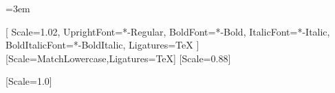 \RequirePackage{fontspec}
\usepackage{babel}
\usepackage{microtype}
\frenchspacing
\emergencystretch=3em
\hfuzz=2pt

\setmainfont{Inter}[
  Scale=1.02,
  UprightFont=*-Regular,
  BoldFont=*-Bold,
  ItalicFont=*-Italic,
  BoldItalicFont=*-BoldItalic,
  Ligatures=TeX
]
\setsansfont{Inter}[Scale=MatchLowercase,Ligatures=TeX]
\setmonofont{DejaVu Sans Mono}[Scale=0.88]
\usepackage{mathtools}
\usepackage{unicode-math}
[Scale=1.0]

\usepackage[a4paper,top=25mm,bottom=28mm,left=25mm,right=25mm,headheight=16pt]{geometry}
\usepackage{booktabs}
\usepackage{longtable}
\usepackage{array}
\usepackage{tabularx}
\usepackage{multirow}
\usepackage{float}
\usepackage{graphicx}
\usepackage{xcolor}
\usepackage{caption}
\usepackage{subcaption}
\usepackage{enumitem}
\usepackage{parskip}
\usepackage{setspace}
\usepackage{fancyhdr}
\usepackage{resizegather}
\usepackage{cancel}
\usepackage{siunitx}
\usepackage{listings}
\usepackage[most]{tcolorbox}
\usepackage{tikz}
\usetikzlibrary{arrows.meta,positioning,shapes.geometric,calc,decorations.pathmorphing}
\usepackage{hyperref}
\usepackage{cleveref}


\newcommand{\xipar}{\texorpdfstring{\ensuremath{\xi}}{xi}}
\newcommand{\pipar}{\texorpdfstring{\ensuremath{\pi}}{pi}}
\providecommand{\Tfield}{T(x,t)}
\providecommand{\Tfieldt}{T(\vec{x},t)}
\newcommand{\Efield}{E(x,t)}
\newcommand{\mfield}{m(x,t)}
\newcommand{\Lag}{\mathcal{L}}
\newcommand{\calL}{\mathcal{L}}
\newcommand{\betaT}{\beta_T}
\newcommand{\Ezero}{E_0}
\newcommand{\EPlanck}{E_{\text{Pl}}}
\newcommand{\Mpl}{M_{\text{Pl}}}
\newcommand{\lP}{\ell_{\text{P}}}
\newcommand{\LPlanck}{\ell_{\text{Pl}}}
\newcommand{\Kfrak}{K_{\text{frak}}}
\newcommand{\Dfrak}{D_{\text{frak}}}
\newcommand{\LCDM}{\Lambda\text{CDM}}
\newcommand{\alphaEM}{\alpha_{\text{EM}}}
\newcommand{\Lxi}{L_\xi}
\newcommand{\Exi}{E_\xi}

